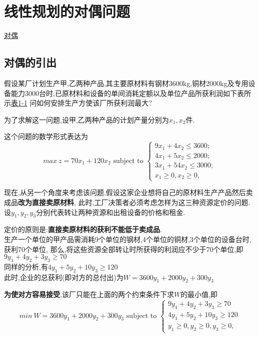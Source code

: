 \chapter{线性规划的对偶问题}
\href{http://course.cug.edu.cn/cugFirst/operational\_research/main/charpter2/p1.htm}{对偶}

\section{对偶的引出}
假设某厂计划生产甲,乙两种产品,其主要原材料有钢材3600kg,铜材2000kg及专用设备能力3000台时,已原材料和设备的单间消耗定额以及单位产品所获利润如下表所示\href{http://course.cug.edu.cn/cugFirst/operational\_research/main/charpter1/p1.files/image001.gif}{表1-1}
问如何安排生产方使该厂所获利润最大?

为了求解这一问题,设甲,乙两种产品的计划产量分别为$x_1, x_2$件.

这个问题的数学形式表达为
\begin{equation}
max\ z = 70x_1 + 120x_2
\mbox{ subject to }
\left\{
  \begin{array}{ll}
		 9x_1 + 4 x_2 \leq 3600; \\
		 4x_1 + 5 x_2 \leq 2000; \\
		 3x_1 + 54 x_2 \leq 3000; \\
		 x_1 \geq 0, x_2 \geq 0,
  \end{array}
\right.
\label{dual.original}
\end{equation}

现在,从另一个角度来考虑该问题,假设这家企业想将自己的原材料生产产品然后卖成品\textbf{改为直接卖原材料},
此时,工厂决策者必须考虑怎样为这三种资源定价的问题.
设$y_1, y_2, y_3$分别代表转让两种资源和出租设备的价格和租金.

定价的原则是:\textbf{直接卖原材料的获利不能低于卖成品}.\\
生产一个单位的甲产品需消耗9个单位的钢材,4个单位的铜材,3个单位的设备台时,获利70个单位,
那么,将这些资源全部转让时所获得的利润应不少于70个单位,即$9y_1 + 4y_2 + 3y_3 \geq 70$\\
同样的分析,有$4y_1 + 5y_2 + 10y_3 \geq 120$\\
此时,企业的总获利(即对方的总付出)为$W = 3600y_1 + 2000y_2 + 300y_3$

\textbf{为使对方容易接受},该厂只能在上面的两个约束条件下求$W$的最小值,即
\begin{equation}
min\ W = 3600y_1 + 2000y_2 + 300y_3
\mbox{ subject to }
\left\{
  \begin{array}{ll}
		9y_1 + 4y_2 + 3y_3 \geq 70 \\
		4y_1 + 5y_2 + 10y_3 \geq 120 \\
		y_1 \geq 0, y_2 \geq 0, y_3 \geq 0,
  \end{array}
\right.
\label{dual.dual}
\end{equation}

